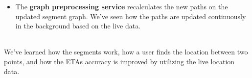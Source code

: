 \begin{itemize}
\item
\protect{}\label{DL5cDB_L2J8ouOSYCu4Ck}
The \textbf{graph preprocessing service} recalculates the new paths on the updated segment graph. We've seen how the paths are updated continuously in the background based on the live data.
\end{itemize}
\\
We've learned how the segments work, how a user finds the location between two points, and how the ETA\textquotesingle s accuracy is improved by utilizing the live location data.


